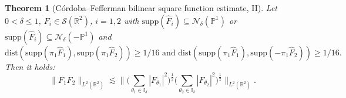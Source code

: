 \documentclass{amsart}
\newtheorem{theorem}{Theorem}[section]
\theoremstyle{definition}
\newcommand{\R}{\mathbb{R}}
\begin{document}
\begin{theorem}[C\'ordoba--Fefferman bilinear square function estimate, II]
\label{thm:SFBO}
Let $0<\delta\leq 1$, $F_i \in \mathcal{S}(\R^2)$, $i=1,2$ with $\text{supp}(\hat{F}_i) \subseteq \mathcal{N}_{\delta}(\mathbb{P}^1)$ or $\text{supp}(\hat{F}_i) \subseteq \mathcal{N}_{\delta}(-\mathbb{P}^1)$ and 
\begin{equation*}
\text{dist}(\text{supp}(\pi_1 \hat{F}_1),\text{supp}(\pi_1 \hat{F}_2)) \geq 1/16 \text{ and }
\text{dist}(\text{supp}(\pi_1 \hat{F}_1),\text{supp}(- \pi_1 \hat{F}_2)) \geq 1/16.
\end{equation*}
Then it holds:
\begin{equation*}
\| F_1 F_2 \|_{L^2(\R^2)} \lesssim \big\| \big( \sum_{\theta_1 \in \mathbb{I}_{\delta}} |F_{\theta_1}|^2 \big)^{\frac{1}{2}} \big( \sum_{\theta_2 \in \mathbb{I}_{\delta}} |F_{\theta_2}|^2 \big)^{\frac{1}{2}} \big\|_{L^2(\R^2)}.
\end{equation*}
\end{theorem}
\end{document}
